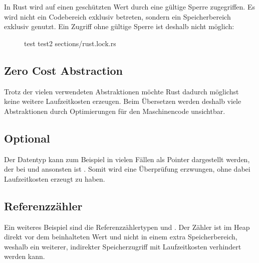 In Rust wird auf einen geschützten Wert durch eine gültige Sperre zugegriffen.
Es wird nicht ein Codebereich exklusiv betreten, sondern ein Speicherbereich exklusiv genutzt.
Ein Zugriff ohne gültige Sperre ist deshalb nicht möglich:

\begin{figure}[H]
	\rustcinclude
		{test}
		{test2}
		{sections/rust.lock.rs}
\end{figure}



\subsection{Zero Cost Abstraction}
\label{rust:zero_cost}

Trotz der vielen verwendeten Abstraktionen möchte Rust dadurch möglichst keine weitere Laufzeitkosten erzeugen.
Beim Übersetzen werden deshalb viele Abstraktionen durch Optimierungen für den Maschinencode unsichtbar.

\subsection{Optional}
\label{rust:zero_cost:optional}

Der  Datentyp kann zum Beispiel in vielen Fällen als Pointer dargestellt werden, der bei   und ansonsten  ist \cite[100]{rust:orly_programming}.
Somit wird eine Überprüfung erzwungen, ohne dabei Laufzeitkosten erzeugt zu haben.


\subsection{Referenzzähler}
\label{rust:zero_cost:refcounter}

Ein weiteres Beispiel sind die Referenzzählertypen  und .
Der Zähler ist im Heap direkt vor dem beinhalteten Wert und nicht in einem extra Speicherbereich, weshalb ein weiterer, indirekter Speicherzugriff mit Laufzeitkosten verhindert werden kann.


